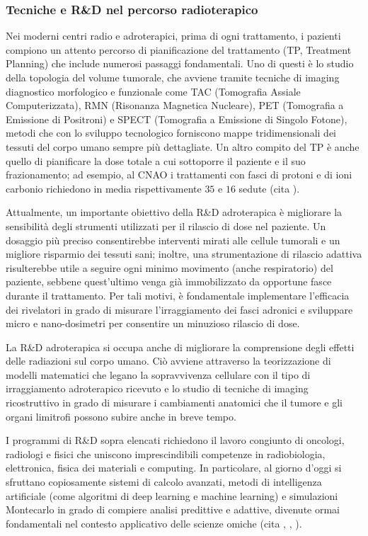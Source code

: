 \documentclass[12pt,a4paper,twoside]{report}
\begin{document}
	\subsubsection{Tecniche e R\&D nel percorso radioterapico}
	Nei moderni centri radio e adroterapici, prima di ogni trattamento, i pazienti compiono un attento percorso di pianificazione del trattamento (TP, Treatment Planning) che include numerosi passaggi fondamentali. Uno di questi è lo studio della topologia del volume tumorale, che avviene tramite tecniche di imaging diagnostico morfologico e funzionale come TAC (Tomografia Assiale Computerizzata), RMN (Risonanza Magnetica Nucleare), PET (Tomografia a Emissione di Positroni) e SPECT (Tomografia a Emissione di Singolo Fotone), metodi che con lo sviluppo tecnologico forniscono mappe tridimensionali dei tessuti del corpo umano sempre più dettagliate. Un altro compito del TP è anche quello di pianificare la dose totale a cui sottoporre il paziente e il suo frazionamento; ad esempio, al CNAO i trattamenti con fasci di protoni e di ioni carbonio richiedono in media rispettivamente $35$ e $16$ sedute (cita
	).
	
	Attualmente, un importante obiettivo della R\&D adroterapica è migliorare la sensibilità degli strumenti utilizzati per il rilascio di dose nel paziente. Un dosaggio più preciso consentirebbe interventi mirati alle cellule tumorali e un migliore risparmio dei tessuti sani; inoltre, una strumentazione di rilascio adattiva risulterebbe utile a seguire ogni minimo movimento (anche respiratorio) del paziente, sebbene quest'ultimo venga già immobilizzato da opportune fasce durante il trattamento. Per tali motivi, è fondamentale implementare l'efficacia dei rivelatori in grado di misurare l'irraggiamento dei fasci adronici e sviluppare micro e nano-dosimetri per consentire un minuzioso rilascio di dose.
	
	La R\&D adroterapica si occupa anche di migliorare la comprensione degli effetti delle radiazioni sul corpo umano. Ciò avviene attraverso la teorizzazione di modelli matematici che legano la sopravvivenza cellulare con il tipo di irraggiamento adroterapico ricevuto e lo studio di tecniche di imaging ricostruttivo in grado di misurare i cambiamenti anatomici che il tumore e gli organi limitrofi possono subire anche in breve tempo.
	
	I programmi di R\&D sopra elencati richiedono il lavoro congiunto di oncologi, radiologi e fisici che uniscono imprescindibili competenze in radiobiologia, elettronica, fisica dei materiali e computing. In particolare, al giorno d'oggi si sfruttano copiosamente sistemi di calcolo avanzati, metodi di intelligenza artificiale (come algoritmi di deep learning e machine learning) e simulazioni Montecarlo in grado di compiere analisi predittive e adattive, divenute ormai fondamentali nel contesto applicativo delle scienze omiche (cita
	,
	,
	).
	
\end{document}
